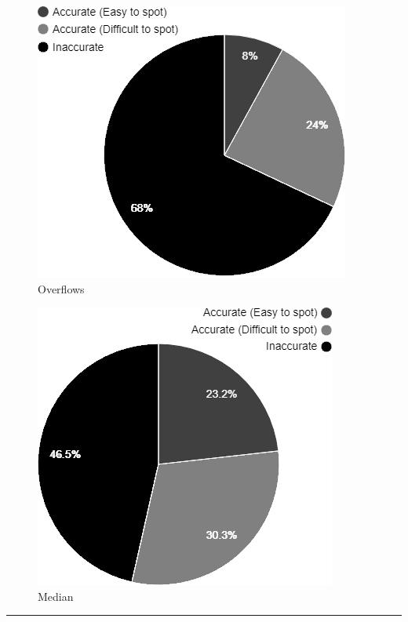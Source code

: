 \hspace{-0.6cm}
\begin{minipage}{0.5\textwidth}
\begin{figure}[H]
    \caption{Overflows}
    \includegraphics[scale=0.65]{./Images/overflows.png}
\end{figure}
\end{minipage}
\hspace{0.8cm}
\begin{minipage}{0.45\textwidth}\raggedleft
\begin{figure}[H]
    \caption{Median}
    \includegraphics[scale=0.65]{./Images/avg.png}
\end{figure}

\end{minipage}
\vspace{0.4cm}
\hrule

